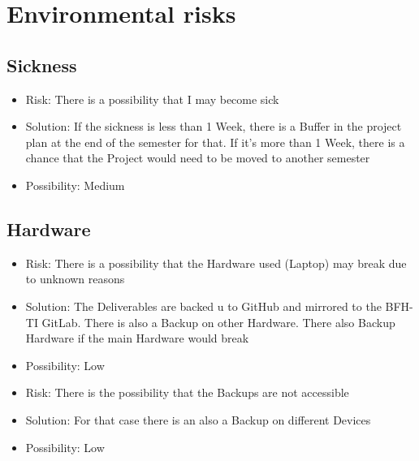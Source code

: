\documentclass[
	a4paper               %
	,BCOR=0mm            %
	,bibliography=totoc   %
	,listof=totoc         %
	,monolingual
	,twoside=false
]{bfhthesis}              %
\begin{document}
\section{Environmental risks}

\subsection{Sickness}
\begin{itemize}
	\item Risk: There is a possibility that I may become sick
	\item Solution: If the sickness is less than 1 Week, there is a Buffer in the project plan at the end of the semester for that. If it's more than 1 Week, there is a chance that the Project would need to be moved to another semester
	\item Possibility: Medium
\end{itemize}

\subsection{Hardware}
\begin{itemize}
	\item Risk: There is a possibility that the Hardware used (Laptop) may break due to unknown reasons
	\item Solution: The Deliverables are backed u to GitHub and mirrored to the BFH-TI GitLab. There is also a Backup on other Hardware. There also Backup Hardware if the main Hardware would break
	\item Possibility: Low
\end{itemize}
\begin{itemize}
	\item Risk: There is the possibility that the Backups are not accessible
	\item Solution: For that case there is an also a Backup on different Devices
	\item Possibility: Low
\end{itemize}
\end{document}
